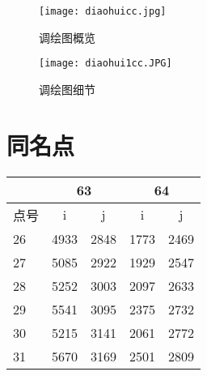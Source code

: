 \begin{figure}[htbp]
\centering
\caption{调绘图概览}
\texttt{[image: diaohuicc.jpg]}
\end{figure}

\begin{figure}[htbp]
\centering
\caption{调绘图细节}
\texttt{[image: diaohui1cc.JPG]}
\end{figure}


\section{同名点}

\begin{table}[htbp]
	\centering
	\begin{tabular}{lrrrr}
		\toprule
		& \multicolumn{2}{c}{63} & \multicolumn{2}{c}{64} \\ \hline
		点号 & \multicolumn{1}{c}{i} & \multicolumn{1}{c}{j} & \multicolumn{1}{c}{i} & \multicolumn{1}{c}{j} \\ \midrule
	    26 & 4933 & 2848 & 1773 & 2469 \\
      27 & 5085 & 2922 & 1929 & 2547 \\
      28 & 5252 & 3003 & 2097 & 2633 \\
      29 & 5541 & 3095 & 2375 & 2732 \\
      30 & 5215 & 3141 & 2061 & 2772 \\
      31 & 5670 & 3169 & 2501 & 2809 \\ \bottomrule
	\end{tabular}
	\end{table}